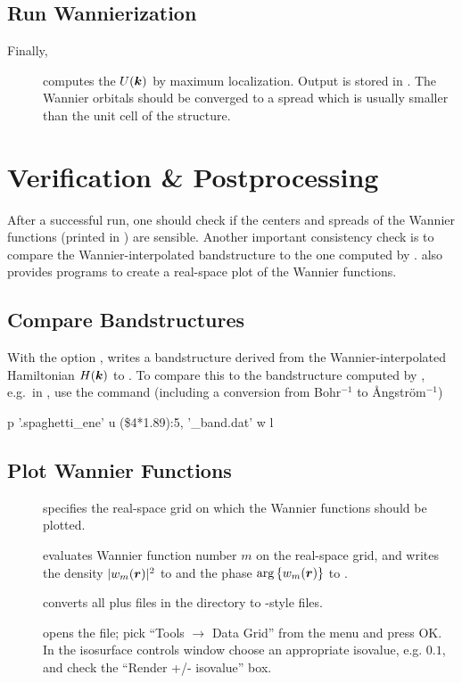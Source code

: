 \subsection{Run Wannierization}
Finally,
\begin{description}
\item[] computes the $U(\boldsymbol k)$ by maximum
  localization.  Output is stored in . The Wannier
  orbitals should be converged to a spread which is usually smaller
  than the unit cell of the structure.
 \end{description}


\section{Verification \& Postprocessing}
\label{sec:quickstart_post}

After a successful \wannier run, one should check if the centers and
spreads of the Wannier functions (printed in ) are
sensible.  Another important consistency check is to compare the
Wannier-interpolated bandstructure to the one computed by \wien.
\Wtow also provides programs to create a real-space plot of the
Wannier functions.

\subsection{Compare Bandstructures}
With the option , \wannier writes a bandstructure
derived from the Wannier-inter\-po\-la\-ted Hamiltonian $H(\boldsymbol k)$ to
.  To compare this to the bandstructure
computed by , e.g.\ in , use the command
(including a conversion from Bohr$^{-1}$ to \AA{}ng\-str\"om$^{-1}$)
\begin{usage}
  p '\case.spaghetti\_ene' u (\$4*1.89):5, '\case{}\_band.dat' w l
\end{usage}

\subsection{Plot Wannier Functions}
\begin{description}
\item[] specifies the real-space grid on which the
  Wannier functions should be plotted.
\item[] evaluates Wannier function number
  $m$ on the real-space grid, and writes the density $|w_m(\boldsymbol r)|^2$
  to  and the phase $\arg\left\{w_m(\boldsymbol
  r)\right\}$ to .
\item [\wplottoxsf] converts all  plus
   files in the directory to \xcrys-style
   files.
\item [] opens the
   file; pick ``Tools $\rightarrow$ Data Grid'' from the
  menu and press OK. In the isosurface controls window choose an
  appropriate isovalue, e.g. $0.1$, and check the ``Render +/-
  isovalue'' box.
\end{description}


